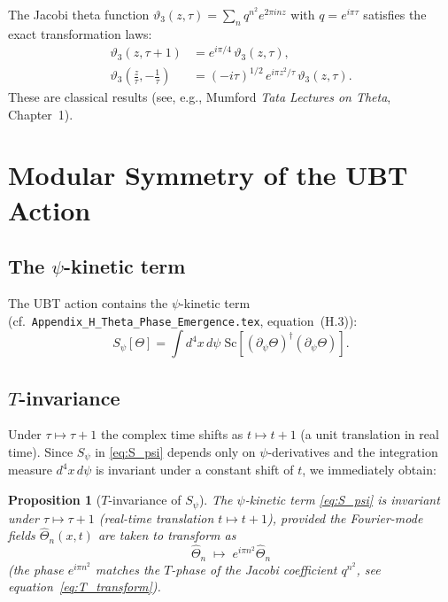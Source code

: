 \documentclass[12pt,a4paper]{article}
\newtheorem{proposition}[theorem]{Proposition}
\theoremstyle{remark}
\newcommand{\Sc}{\mathrm{Sc}}
\newcommand{\varthree}{\vartheta_3}
\begin{document}
The Jacobi theta function $\varthree(z,\tau) = \sum_n q^{n^2} e^{2\pi inz}$
with $q=e^{i\pi\tau}$ satisfies the exact transformation laws:
\begin{align}
  \varthree(z,\tau+1)
  &= e^{i\pi/4}\,\varthree(z,\tau),
  \label{eq:T_transform}
  \\
  \varthree\!\left(\frac{z}{\tau},-\frac{1}{\tau}\right)
  &= (-i\tau)^{1/2}\,e^{i\pi z^2/\tau}\,\varthree(z,\tau).
  \label{eq:S_transform}
\end{align}
These are classical results (see, e.g., Mumford \textit{Tata Lectures on
Theta}, Chapter~1).

\section{Modular Symmetry of the UBT Action}
\label{sec:ubt_modular}

\subsection{The $\psi$-kinetic term}

The UBT action contains the $\psi$-kinetic term (cf.\
\texttt{Appendix\_H\_Theta\_Phase\_Emergence.tex}, equation~(H.3)):
\begin{equation}
  \label{eq:S_psi}
  S_\psi[\Theta]
  = \int d^4x\,d\psi\;
    \Sc\!\left[(\partial_\psi\Theta)^\dagger(\partial_\psi\Theta)\right].
\end{equation}

\subsection{$T$-invariance}

Under $\tau\mapsto\tau+1$ the complex time shifts as $t\mapsto t+1$ (a
unit translation in real time).  Since $S_\psi$ in
\eqref{eq:S_psi} depends only on $\psi$-derivatives and the integration
measure $d^4x\,d\psi$ is invariant under a constant shift of $t$, we
immediately obtain:

\begin{proposition}[$T$-invariance of $S_\psi$]
\label{prop:T_inv}
The $\psi$-kinetic term \eqref{eq:S_psi} is invariant under
$\tau\mapsto\tau+1$ (real-time translation $t\mapsto t+1$), provided
the Fourier-mode fields $\hat\Theta_n(x,t)$ are taken to transform as
\begin{equation}
  \hat\Theta_n \;\mapsto\; e^{i\pi n^2}\hat\Theta_n
\end{equation}
(the phase $e^{i\pi n^2}$ matches the $T$-phase of the Jacobi
coefficient $q^{n^2}$, see equation~\eqref{eq:T_transform}).
\end{proposition}
\end{document}
